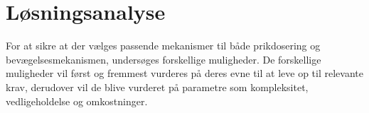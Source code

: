 \section{Løsningsanalyse} \label{Løsningsanalyse}

For at sikre at der vælges passende mekanismer til både prikdosering og bevægelsesmekanismen, undersøges forskellige muligheder. De forskellige muligheder vil først og fremmest vurderes på deres evne til at leve op til relevante krav, derudover vil de blive vurderet på parametre som 
kompleksitet, vedligeholdelse og omkostninger.